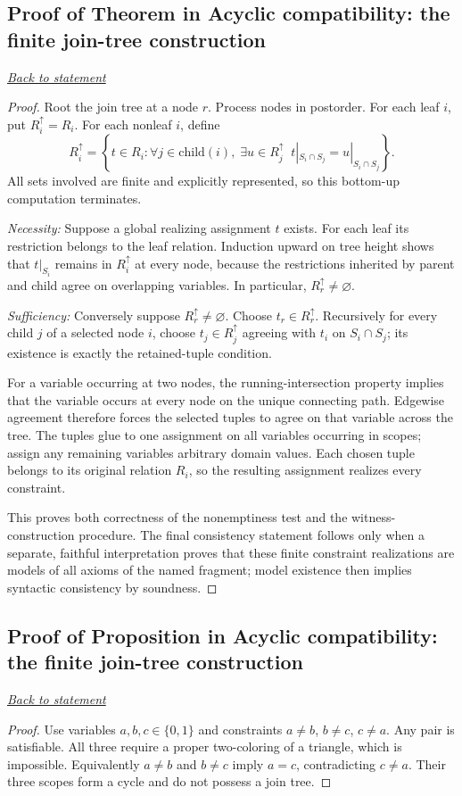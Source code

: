 \documentclass[11pt,letterpaper]{article}
\theoremstyle{definition}\newtheorem{definition}[theorem]{Definition}\newtheorem{example}[theorem]{Example}
\theoremstyle{remark}\newtheorem{remark}[theorem]{Remark}
\newcommand{\backlink}[1]{\noindent\hyperref[#1]{\textit{Back to statement}}\par\smallskip}
\begin{document}
\subsection{Proof of Theorem in Acyclic compatibility: the finite join-tree construction}\label{br:compat:proof:1}\backlink{br:compat:stmt:1}
\begin{proof}
Root the join tree at a node \(r\). Process nodes in postorder. For each leaf \(i\), put \(R_i^{\uparrow}=R_i\). For each nonleaf \(i\), define
\[
R_i^{\uparrow}=\left\{t\in R_i:\forall j\in\mathrm{child}(i),\;\exists u\in R_j^{\uparrow}\;\; t|_{S_i\cap S_j}=u|_{S_i\cap S_j}\right\}.
\]
All sets involved are finite and explicitly represented, so this bottom-up computation terminates.

\emph{Necessity:} Suppose a global realizing assignment \(t\) exists. For each leaf its restriction belongs to the leaf relation. Induction upward on tree height shows that \(t|_{S_i}\) remains in \(R_i^{\uparrow}\) at every node, because the restrictions inherited by parent and child agree on overlapping variables. In particular, \(R_r^{\uparrow}\neq\varnothing\).

\emph{Sufficiency:} Conversely suppose \(R_r^{\uparrow}\neq\varnothing\). Choose \(t_r\in R_r^{\uparrow}\). Recursively for every child \(j\) of a selected node \(i\), choose \(t_j\in R_j^{\uparrow}\) agreeing with \(t_i\) on \(S_i\cap S_j\); its existence is exactly the retained-tuple condition.

For a variable occurring at two nodes, the running-intersection property implies that the variable occurs at every node on the unique connecting path. Edgewise agreement therefore forces the selected tuples to agree on that variable across the tree. The tuples glue to one assignment on all variables occurring in scopes; assign any remaining variables arbitrary domain values. Each chosen tuple belongs to its original relation \(R_i\), so the resulting assignment realizes every constraint.

This proves both correctness of the nonemptiness test and the witness-construction procedure. The final consistency statement follows only when a separate, faithful interpretation proves that these finite constraint realizations are models of all axioms of the named fragment; model existence then implies syntactic consistency by soundness.
\end{proof}

\subsection{Proof of Proposition in Acyclic compatibility: the finite join-tree construction}\label{br:compat:proof:2}\backlink{br:compat:stmt:2}
\begin{proof}
Use variables \(a,b,c\in\{0,1\}\) and constraints \(a\neq b\), \(b\neq c\), \(c\neq a\). Any pair is satisfiable. All three require a proper two-coloring of a triangle, which is impossible. Equivalently \(a\neq b\) and \(b\neq c\) imply \(a=c\), contradicting \(c\neq a\). Their three scopes form a cycle and do not possess a join tree.
\end{proof}
\end{document}
